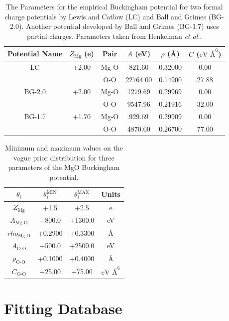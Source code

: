 \begin{table}[ht]
	\caption{The Parameters for the empirical Buckingham potential for two formal charge potentials by Lewis and Catlow (LC)\cite{lewis1985_buckingham} and Ball and Grimes (BG-2.0). Another potential developed by Ball and Grimes (BG-1.7) uses partial charges. Parameters taken from Henkelman \emph{et al.}\cite{henkelman2005_buckingham_MgO}.}
	\label{tlb:MgO_prior_potentials}
	\centering
	\begin{tabular}{cccccc}
		\hline
		{Potential Name} & {$Z_{\text{Mg}}$ (e)} & Pair	 & $A$ (eV) & $\rho$ (\AA)	& $C$ ($\text{eV \AA}^6$) \\
		\hline
		LC	&    +2.00   &  Mg-O   &	 821.60  &   0.32000  &  0.00 \\
			  &            &   O-O	 & 22764.00	 &   0.14900  & 27.88 \\
		BG-2.0 & +2.00   &	Mg-O	 &  1279.69  &   0.29969  &  0.00 \\
		       &         & 	 O-O	 &  9547.96	 &   0.21916	& 32.00 \\
		BG-1.7 &  +1.70  &  Mg-O   &   929.69  &   0.29909  &	 0.00 \\
           &         &   O-O   &  4870.00	 &   0.26700  &	77.00 \\
		\hline
	\end{tabular}
\end{table}

\begin{table}[ht]
	\caption{Minimum and maximum values on the vague prior distribution for three parameters of the MgO Buckingham potential.}
	\label{tbl:MgO_inital_distribution}
	\centering
	\begin{tabular}{cccc}
    \hline
		$\theta_i$ & $\theta_i^{\text{MIN}}$ & $\theta_i^{\text{MAX}}$ & Units \\
		\hline
		$Z_{\text{Mg}}$ & +1.5 & +2.5 & e \\
		$A_{\text{Mg-O}}$ & +800.0 & +1300.0 & eV \\
		$rho_{\text{Mg-O}}$ & +0.2900 & +0.3300 & \AA \\
		$A_{\text{O-O}}$ & +500.0 & +2500.0 & eV \\
		$\rho_{\text{O-O}}$ & +0.1000 & +0.4000 & \AA \\
		$C_{\text{O-O}}$ & +25.00 & +75.00 & $\text{eV \AA}^6$ \\
	  \hline
	\end{tabular}
\end{table}

\section{Fitting Database}

